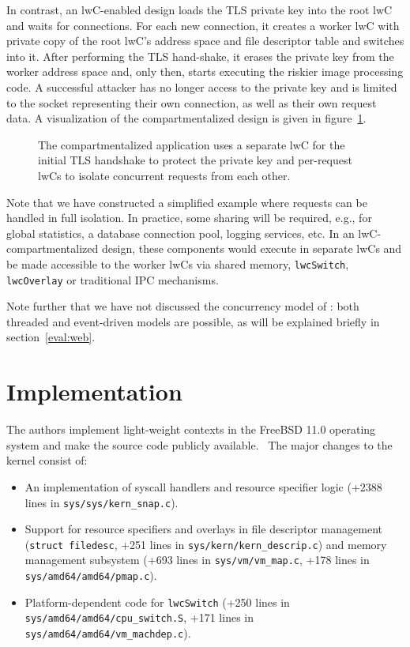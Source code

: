 \documentclass[10pt,twocolumn,a4paper]{article}
\begin{document}
In contrast, an lwC-enabled design loads the TLS private key into the root lwC and waits for connections.
For each new connection, it creates a worker lwC with private copy of the root lwC's address space and file descriptor table and switches into it.
After performing the TLS hand-shake, it erases the private key from the worker address space and, only then, starts executing the riskier image processing code.
A successful attacker has no longer access to the private key and is limited to the socket representing their own connection, as well as their own request data.
A visualization of the compartmentalized design is given in figure~\ref{design:usage:apparchpost}.

\begin{figure}
  \centering
  \caption{
    The compartmentalized \appname application uses a separate lwC for the initial TLS handshake to protect the private key and per-request lwCs to isolate concurrent requests from each other.
    \label{design:usage:apparchpost}
  }
\end{figure}

Note that we have constructed a simplified example where requests can be handled in full isolation.
In practice, some sharing will be required, e.g., for global statistics, a database connection pool, logging services, etc.
In an lwC-compartmentalized design, these components would execute in separate lwCs and be made accessible to the worker lwCs via shared memory, \lstinline{lwcSwitch}, \lstinline{lwcOverlay} or traditional IPC mechanisms.

Note further that we have not discussed the concurrency model of \appname:
both threaded and event-driven models are possible, as will be explained briefly in section~\ref{eval:web}.


\section{Implementation}\label{impl}

The authors implement light-weight contexts in the FreeBSD 11.0 operating system and make the source code publicly available.~\cite{lwckernelrepo,lwclibsrepo} %
The major changes to the kernel consist of:
\begin{itemize}[nosep]
  \item An implementation of syscall handlers and resource specifier logic (+2388 lines in \texttt{sys/sys/kern\_snap.c}).
  \item Support for resource specifiers and overlays in
    file descriptor management (\lstinline{struct filedesc}, +251 lines in \texttt{sys/kern/kern\_descrip.c})
    and memory management subsystem  (+693 lines in \texttt{sys/vm/vm\_map.c}, +178 lines in \texttt{sys/amd64/amd64/pmap.c}).
  \item Platform-dependent code for \lstinline{lwcSwitch} (+250 lines in \texttt{sys/amd64/amd64/cpu\_switch.S}, +171 lines in \texttt{sys/amd64/amd64/vm\_machdep.c}).
\end{itemize}
\end{document}
